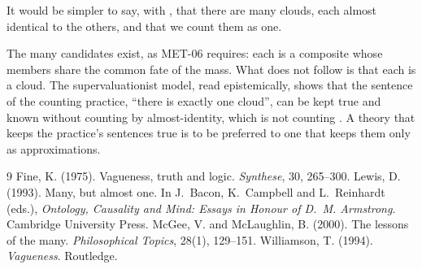 \documentclass{situationist-preprint}
\begin{document}
\begin{objection}
It would be simpler to say, with \citet{Lewis1993}, that there are many clouds, each almost identical to the others, and that we count them as one.
\end{objection}

\begin{reply}
The many candidates exist, as MET-06 requires: each is a composite whose members share the common fate of the mass. What does not follow is that each is a cloud. The supervaluationist model, read epistemically, shows that the sentence of the counting practice, \enquote{there is exactly one cloud}, can be kept true and known without counting by almost-identity, which is not counting \citep{McGee2000}. A theory that keeps the practice's sentences true is to be preferred to one that keeps them only as approximations.
\end{reply}

\begin{thebibliography}{9}\small
{} Fine, K. (1975). Vagueness, truth and logic. \emph{Synthese}, 30, 265--300.
 Lewis, D. (1993). Many, but almost one. In J.~Bacon, K.~Campbell and L.~Reinhardt (eds.), \emph{Ontology, Causality and Mind: Essays in Honour of D.~M. Armstrong}. Cambridge University Press.
 McGee, V. and McLaughlin, B. (2000). The lessons of the many. \emph{Philosophical Topics}, 28(1), 129--151.
 Williamson, T. (1994). \emph{Vagueness}. Routledge.
\end{thebibliography}
\end{document}
